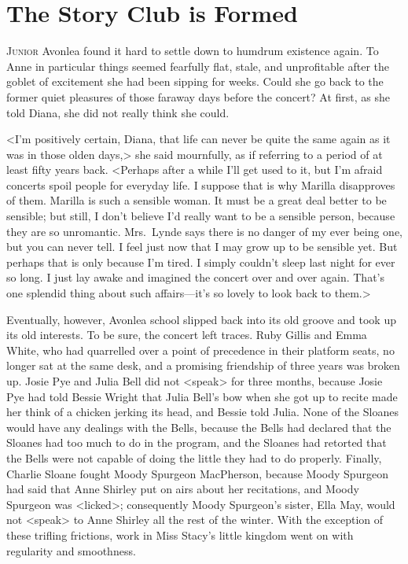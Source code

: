 \chapter{The Story Club is Formed}

\lettrine[]{J}{unior} Avonlea found it hard to settle down to humdrum existence again. To Anne in particular things seemed fearfully flat, stale, and unprofitable after the goblet of excitement she had been sipping for weeks. Could she go back to the former quiet pleasures of those faraway days before the concert? At first, as she told Diana, she did not really think she could.

<I'm positively certain, Diana, that life can never be quite the same again as it was in those olden days,> she said mournfully, as if referring to a period of at least fifty years back. <Perhaps after a while I'll get used to it, but I'm afraid concerts spoil people for everyday life. I suppose that is why Marilla disapproves of them. Marilla is such a sensible woman. It must be a great deal better to be sensible; but still, I don't believe I'd really want to be a sensible person, because they are so unromantic. Mrs.~Lynde says there is no danger of my ever being one, but you can never tell. I feel just now that I may grow up to be sensible yet. But perhaps that is only because I'm tired. I simply couldn't sleep last night for ever so long. I just lay awake and imagined the concert over and over again. That's one splendid thing about such affairs—it's so lovely to look back to them.>

Eventually, however, Avonlea school slipped back into its old groove and took up its old interests. To be sure, the concert left traces. Ruby Gillis and Emma White, who had quarrelled over a point of precedence in their platform seats, no longer sat at the same desk, and a promising friendship of three years was broken up. Josie Pye and Julia Bell did not <speak> for three months, because Josie Pye had told Bessie Wright that Julia Bell's bow when she got up to recite made her think of a chicken jerking its head, and Bessie told Julia. None of the Sloanes would have any dealings with the Bells, because the Bells had declared that the Sloanes had too much to do in the program, and the Sloanes had retorted that the Bells were not capable of doing the little they had to do properly. Finally, Charlie Sloane fought Moody Spurgeon MacPherson, because Moody Spurgeon had said that Anne Shirley put on airs about her recitations, and Moody Spurgeon was <licked>; consequently Moody Spurgeon's sister, Ella May, would not <speak> to Anne Shirley all the rest of the winter. With the exception of these trifling frictions, work in Miss Stacy's little kingdom went on with regularity and smoothness.

